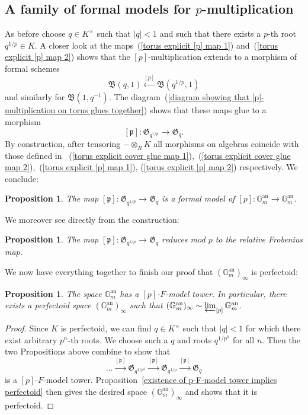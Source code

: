 \documentclass[11pt,oneside]{amsart}
\newtheorem{proposition}[theorem]{Proposition}
\theoremstyle{definition}
\theoremstyle{remark}
\begin{document}
	\subsection{A family of formal models for $p$-multiplication}
	As before choose $q\in K^\times$ such that $|q|<1$ and such that there exists a $p$-th root $q^{1/p} \in K$. A closer look at the maps~(\ref{torus explicit [p] map 1}) and~(\ref{torus explicit [p] map 2}) shows that the $[p]$-multiplication extends to a morphism of formal schemes
	\[\mathfrak B(q,1)\xleftarrow{[p]} \mathfrak B(q^{1/p},1)\]
	and similarly for $\mathfrak B(1,q^{-1})$. The diagram~(\ref{diagram showing that [p]-multiplication on torus glues together}) shows that these maps glue to a morphism
	\[[\mathfrak p]: \mathfrak G_{q^{1/p}}\rightarrow  \mathfrak G_q.\]
	By construction, after tensoring $-\otimes_R K$ all morphisms on algebras coincide with those defined in ~(\ref{torus explicit cover glue map 1}),~(\ref{torus explicit cover glue map 2}),~(\ref{torus explicit [p] map 1}), (\ref{torus explicit [p] map 2}) respectively. We conclude:
	\begin{proposition}
		The map $[\mathfrak p]: \mathfrak G_{q^{1/p}}\rightarrow  \mathfrak G_q$ is a formal model of $[p]:\mathbb G_m^{\operatorname{an}}\rightarrow \mathbb G_m^{\operatorname{an}}$.
	\end{proposition}
	We moreover see directly from the construction:
	\begin{proposition}
		The map $[\mathfrak p]: \mathfrak G_{q^{1/p}}\rightarrow  \mathfrak G_q$ reduces mod $p$ to the relative Frobenius map.
	\end{proposition}
	We now have everything together to finish our proof that $(\mathbb G_m^{\operatorname{an}})_\infty$ is perfectoid:
	\begin{proposition}
		The space $\mathbb G_m^{\operatorname{an}}$ has a $[p]$-$F$-model tower. In particular, there exists a perfectoid space $(\mathbb G_m^{\operatorname{an}})_\infty$ such that $(\mathbb G_m^{\operatorname{an}})_\infty \sim \varprojlim_{[p]} \mathbb G_m^{\operatorname{an}}$.
	\end{proposition}
	\begin{proof}
		Since $K$ is perfectoid, we can find $q\in K^\times$ such that $|q|<1$ for which there exist arbitrary $p^n$-th roots. We choose such a $q$ and roots $q^{1/p^n}$ for all $n$. Then the two Propositions above combine to show that 
		\[\dots \xrightarrow{[\mathfrak p]} \mathfrak G_{q^{1/p^2}}\xrightarrow{[\mathfrak p]} \mathfrak G_{q^{1/p}}\xrightarrow{[\mathfrak p]} \mathfrak G_q\]
		is a $[p]$-$F$-model tower. Proposition~\ref{existence of p-F-model tower implies perfectoid} then gives the desired space $(\mathbb G_m^{\operatorname{an}})_\infty$ and shows that it is perfectoid.
	\end{proof}
	
\end{document}
